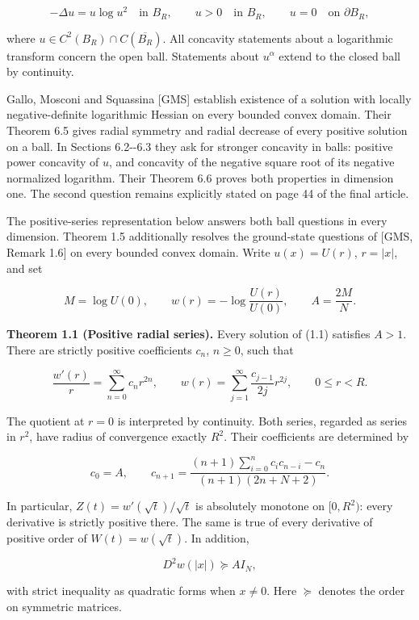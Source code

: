 \documentclass[11pt]{article}
\begin{document}
\[
-\Delta u=u\log u^2\quad\text{in }B_R,
\qquad u>0\quad\text{in }B_R,
\qquad u=0\quad\text{on }\partial B_R,
\tag{1.1}
\]

where \(u\in C^2(B_R)\cap C(\overline{B_R})\). All concavity statements
about a logarithmic transform concern the open ball. Statements about
\(u^\alpha\) extend to the closed ball by continuity.

Gallo, Mosconi and Squassina {[}GMS{]} establish existence of a solution
with locally negative-definite logarithmic Hessian on every bounded
convex domain. Their Theorem 6.5 gives radial symmetry and radial
decrease of every positive solution on a ball. In Sections 6.2-\/-6.3
they ask for stronger concavity in balls: positive power concavity of
\(u\), and concavity of the negative square root of its negative
normalized logarithm. Their Theorem 6.6 proves both properties in
dimension one. The second question remains explicitly stated on page 44
of the final article.

The positive-series representation below answers both ball questions in
every dimension. Theorem 1.5 additionally resolves the ground-state
questions of {[}GMS, Remark 1.6{]} on every bounded convex domain. Write
\(u(x)=U(r)\), \(r=|x|\), and set

\[
M=\log U(0),\qquad
w(r)=-\log\frac{U(r)}{U(0)},\qquad
A=\frac{2M}{N}.
\tag{1.2}
\]

\textbf{Theorem 1.1 (Positive radial series).} Every solution of (1.1)
satisfies \(A>1\). There are strictly positive coefficients \(c_n\),
\(n\geq0\), such that

\[
\frac{w'(r)}r=\sum_{n=0}^\infty c_n r^{2n},
\qquad
w(r)=\sum_{j=1}^\infty\frac{c_{j-1}}{2j}r^{2j},
\qquad 0\leq r<R.
\tag{1.3}
\]

The quotient at \(r=0\) is interpreted by continuity. Both series,
regarded as series in \(r^2\), have radius of convergence exactly
\(R^2\). Their coefficients are determined by

\[
c_0=A,\qquad
c_{n+1}=
\frac{(n+1)\displaystyle\sum_{i=0}^n c_i c_{n-i}-c_n}
{(n+1)(2n+N+2)}.
\tag{1.4}
\]

In particular, \(Z(t)=w'(\sqrt t)/\sqrt t\) is absolutely monotone on
\([0,R^2)\): every derivative is strictly positive there. The same is
true of every derivative of positive order of \(W(t)=w(\sqrt t)\). In
addition,

\[
D^2w(|x|)\succeq A I_N,
\tag{1.5}
\]

with strict inequality as quadratic forms when \(x\neq0\). Here
\(\succeq\) denotes the order on symmetric matrices.
\end{document}
